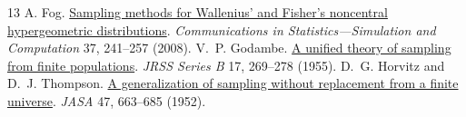 \documentclass[10pt]{article}
\begin{document}
\begin{thebibliography}{13}
 A. Fog. \href{https://doi.org/10.1080/03610910701790236}{Sampling methods for Wallenius' and Fisher's noncentral hypergeometric distributions}. \emph{Communications in Statistics---Simulation and Computation} 37, 241--257 (2008).
 V.~P. Godambe. \href{https://academic.oup.com/jrsssb/article/17/2/269/7026727}{A unified theory of sampling from finite populations}. \emph{JRSS Series B} 17, 269--278 (1955).
 D.~G. Horvitz and D.~J. Thompson. \href{https://doi.org/10.1080/01621459.1952.10483446}{A generalization of sampling without replacement from a finite universe}. \emph{JASA} 47, 663--685 (1952).
\end{thebibliography}
\end{document}
